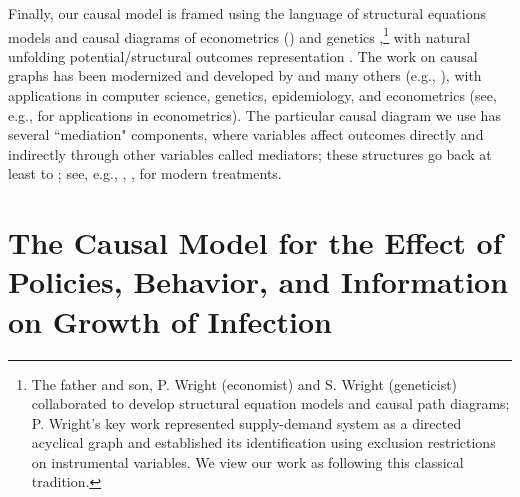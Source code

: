 \documentclass[11pt,reqno,letter]{amsart}
\theoremstyle{definition}
\begin{document}
Finally, our causal model is framed using the language of structural equations models and causal diagrams of econometrics (\cite{pwright, haavelmo:1944, tinbergen:1940, wold:1954, pearl:biometrika}) and genetics \citep{wright1923},\footnote{The father and son, P. Wright (economist) and S. Wright (geneticist) collaborated to develop structural equation models and causal path diagrams; P. Wright's key work represented supply-demand system as a directed acyclical graph and established its identification using exclusion restrictions on instrumental variables. We view our work as following this classical tradition.} with natural unfolding potential/structural outcomes representation \citep{rubin1974,tinbergen1930,neyman:PO,imbens_rubin_2015}. The work on causal graphs has been modernized and developed by \cite{pearl:biometrika,pearl:robins,pearl:causality,pearl:why} and many others (e.g., \cite{pearl:why,white:chalak,richardson:mediation,peters2020book,bareinboim:H,hernanrobins2020book}), with applications in computer science, genetics, epidemiology, and econometrics (see, e.g., \cite{heckman:pinto,hunermund,white:chalak} for applications in econometrics). The particular causal diagram we use has several ``mediation" components, where variables affect outcomes directly and indirectly through other variables called mediators; these structures go back at least to \citet[][see Figure 6]{wright1923}; see, e.g., \cite{baron1986}, \cite{Hines2020}, \cite{richardson:mediation} for modern treatments. 

\section{The Causal Model for the Effect of Policies, Behavior, and Information on Growth of Infection}\label{sec:causal-model}
\end{document}
